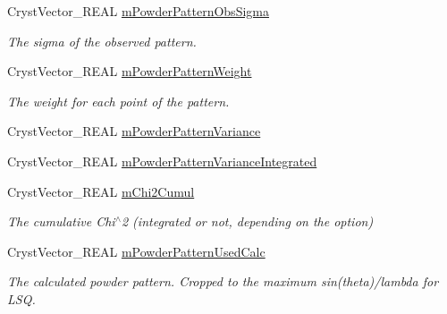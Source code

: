 \begin{DoxyCompactItemize}
\mbox{\label{class_obj_cryst_1_1_powder_pattern_ab0468caae908a520555da3b104714129}} 
Cryst\+Vector\+\_\+\+R\+E\+AL \mbox{\hyperlink{class_obj_cryst_1_1_powder_pattern_ab0468caae908a520555da3b104714129}{m\+Powder\+Pattern\+Obs\+Sigma}}
\begin{DoxyCompactList}\small\item\em The sigma of the observed pattern. \end{DoxyCompactList}\item 
\mbox{\label{class_obj_cryst_1_1_powder_pattern_a65da6b3a338951905cf52aa4b22f9324}} 
Cryst\+Vector\+\_\+\+R\+E\+AL \mbox{\hyperlink{class_obj_cryst_1_1_powder_pattern_a65da6b3a338951905cf52aa4b22f9324}{m\+Powder\+Pattern\+Weight}}
\begin{DoxyCompactList}\small\item\em The weight for each point of the pattern. \end{DoxyCompactList}\item 
Cryst\+Vector\+\_\+\+R\+E\+AL \mbox{\hyperlink{class_obj_cryst_1_1_powder_pattern_ac962c591539d06c65ce32e56580029c2}{m\+Powder\+Pattern\+Variance}}
\item 
Cryst\+Vector\+\_\+\+R\+E\+AL \mbox{\hyperlink{class_obj_cryst_1_1_powder_pattern_a7c7192cf095beca2d515a15f4c57d227}{m\+Powder\+Pattern\+Variance\+Integrated}}
\item 
\mbox{\label{class_obj_cryst_1_1_powder_pattern_a0ed58eb5c5c33166838c1d57aa26ddae}} 
Cryst\+Vector\+\_\+\+R\+E\+AL \mbox{\hyperlink{class_obj_cryst_1_1_powder_pattern_a0ed58eb5c5c33166838c1d57aa26ddae}{m\+Chi2\+Cumul}}
\begin{DoxyCompactList}\small\item\em The cumulative Chi$^\wedge$2 (integrated or not, depending on the option) \end{DoxyCompactList}\item 
\mbox{\label{class_obj_cryst_1_1_powder_pattern_a4857b149efae6be6014648718d1cf62c}} 
Cryst\+Vector\+\_\+\+R\+E\+AL \mbox{\hyperlink{class_obj_cryst_1_1_powder_pattern_a4857b149efae6be6014648718d1cf62c}{m\+Powder\+Pattern\+Used\+Calc}}
\begin{DoxyCompactList}\small\item\em The calculated powder pattern. Cropped to the maximum sin(theta)/lambda for L\+SQ. \end{DoxyCompactList}\item 

\end{DoxyCompactItemize}

